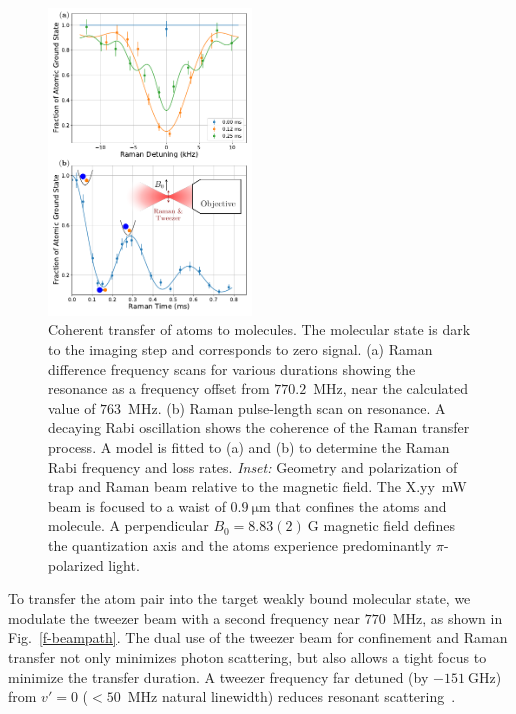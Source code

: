 \documentclass[aps,prl,twocolumn,10pt,superscriptaddress]{revtex4-1}
\newcommand{\Na}{\mathrm{Na}}
\newcommand{\Cs}{\mathrm{Cs}}
\begin{document}
\begin{figure}[t!]
  \includegraphics[width=0.48\textwidth]{imgs/fig-raman.pdf}
  \caption{Coherent transfer of atoms to molecules.  The molecular state is dark to the imaging step and corresponds to zero signal.
    (a) Raman difference frequency scans for various durations showing the resonance as a frequency offset from $770.2$~MHz, near the calculated value of $763$~MHz.
    (b) Raman pulse-length scan on resonance.
    A decaying Rabi oscillation shows the coherence of
    the Raman transfer process.
    A model is fitted to (a) and (b) to determine
    the Raman Rabi frequency and loss rates.
    \emph{Inset:} Geometry and polarization of trap and Raman beam relative to the magnetic field.
    The X.yy~mW beam is focused to a waist of $0.9~\mathrm{\mu m}$
    that confines the atoms and molecule.
    A perpendicular $B_0=8.83(2)~\mathrm{G}$ magnetic field
    defines the quantization axis and the atoms experience predominantly $\pi$-polarized light.
    \label{f-raman}}
\end{figure}
To transfer the atom pair into the target weakly bound molecular state,
we modulate the tweezer beam with a second frequency near $770$~MHz, as shown in Fig.~\ref{f-beampath}.
The dual use of the tweezer beam for confinement and Raman transfer not only minimizes photon scattering,
but also allows a tight focus to minimize the transfer duration. A tweezer frequency far detuned (by $-151~\mathrm{GHz}$) from $v' = 0 $ ($<50$~MHz natural linewidth) reduces resonant scattering~\cite{Liu2019}.
\end{document}

